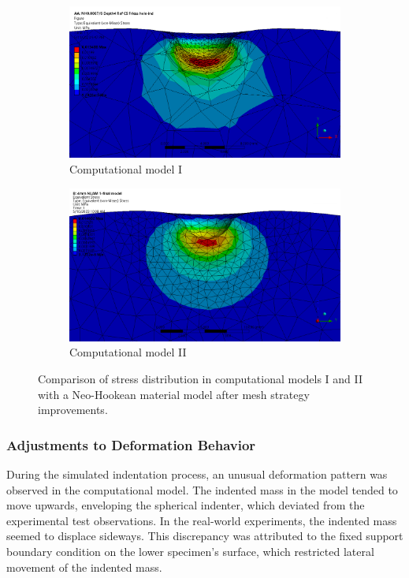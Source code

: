 \begin{figure}
    \centering
    \begin{subfigure}[b]{0.7\textwidth}
    \centering
    \includegraphics[width=\textwidth]{Images/computational/37CSNHstresshalfzoommesh.png}
    \caption{Computational model I}
    \label{fig:cm1stress}
    \end{subfigure}
    \hspace{0.3cm}
    \begin{subfigure}[b]{0.7\textwidth}
    \centering
    \includegraphics[width=\textwidth]{Images/computational/stresscmII.png}
    \caption{Computational model II}
    \label{fig:cm2stress}
    \end{subfigure}
    \hspace{0.3cm}
    \caption[Stress distribution analysis]{Comparison of stress distribution in computational models I and II with a Neo-Hookean material model after mesh strategy improvements.}
    \label{fig:cmIIstressdistanalysis}
\end{figure}

\subsubsection*{Adjustments to Deformation Behavior}
During the simulated indentation process, an unusual deformation pattern was observed in the computational model.
The indented mass in the model tended to move upwards, enveloping the spherical indenter, which deviated from the 
experimental test observations. In the real-world experiments, the indented mass seemed to 
displace sideways. This discrepancy was attributed to the fixed support boundary condition on the lower specimen's 
surface, which restricted lateral movement of the indented mass.

